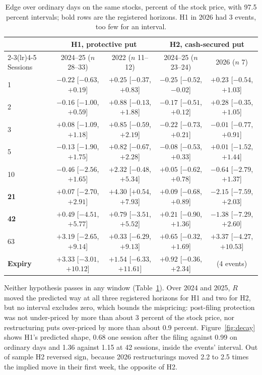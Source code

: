 \documentclass[11pt]{article}
\makeatletter
\renewcommand\section{\@startsection{section}{1}{\z@}{-1.2ex \@plus -.3ex \@minus -.2ex}{0.4ex}{\normalfont\normalsize\bfseries}}
\makeatother
\begin{document}
\section{Results}
\begin{table}[h]
\centering
\caption{Edge over ordinary days on the same stocks, percent of the stock price, with 97.5 percent intervals; bold rows are the registered horizons. H1 in 2026 had 3 events, too few for an interval.}
\label{tab:edge}
\small
\setlength{\tabcolsep}{4pt}
\begin{tabular}{lcccc}
\toprule
 & \multicolumn{2}{c}{H1, protective put} & \multicolumn{2}{c}{H2, cash-secured put} \\
\cmidrule(lr){2-3}\cmidrule(lr){4-5}
Sessions & 2024--25 ($n$ 28--33) & 2022 ($n$ 11--12) & 2024--25 ($n$ 23--24) & 2026 ($n$ 7) \\
\midrule
1  & $-0.22$ [$-0.63$, $+0.19$] & $+0.25$ [$-0.37$, $+0.83$] & $-0.25$ [$-0.52$, $-0.02$] & $+0.23$ [$-0.54$, $+1.03$] \\
2  & $-0.16$ [$-1.00$, $+0.59$] & $+0.88$ [$-0.13$, $+1.88$] & $-0.17$ [$-0.51$, $+0.12$] & $+0.28$ [$-0.35$, $+1.05$] \\
3  & $+0.08$ [$-1.09$, $+1.18$] & $+0.85$ [$-0.59$, $+2.19$] & $-0.22$ [$-0.73$, $+0.21$] & $-0.01$ [$-0.77$, $+0.91$] \\
5  & $-0.13$ [$-1.90$, $+1.75$] & $+0.82$ [$-0.67$, $+2.28$] & $-0.08$ [$-0.53$, $+0.33$] & $+0.01$ [$-1.52$, $+1.44$] \\
10 & $-0.46$ [$-2.56$, $+1.65$] & $+2.32$ [$-0.48$, $+5.34$] & $+0.05$ [$-0.62$, $+0.78$] & $-0.64$ [$-2.79$, $+1.37$] \\
\textbf{21} & $+0.07$ [$-2.70$, $+2.91$] & $\mathbf{+4.30}$ [$+0.54$, $+7.93$] & $+0.09$ [$-0.68$, $+0.89$] & $-2.15$ [$-7.59$, $+2.03$] \\
\textbf{42} & $+0.49$ [$-4.51$, $+5.77$] & $+0.79$ [$-3.51$, $+5.52$] & $+0.21$ [$-0.90$, $+1.36$] & $-1.38$ [$-7.29$, $+2.60$] \\
63 & $+3.19$ [$-2.65$, $+9.14$] & $+0.33$ [$-6.29$, $+9.13$] & $+0.65$ [$-0.32$, $+1.69$] & $+3.37$ [$-4.27$, $+10.53$] \\
\textbf{Expiry} & $+3.33$ [$-3.01$, $+10.12$] & $+1.54$ [$-6.33$, $+11.61$] & $+0.92$ [$-0.36$, $+2.34$] & (4 events) \\
\bottomrule
\end{tabular}
\end{table}

Neither hypothesis passes in any window (Table~\ref{tab:edge}). Over 2024 and 2025, $R$ moved the predicted way at all three registered horizons for H1 and two for H2, but no interval excludes zero, which bounds the mispricing: post-filing protection was not under-priced by more than about 3 percent of the stock price, nor restructuring puts over-priced by more than about 0.9 percent. Figure~\ref{fig:decay} shows H1's predicted shape, 0.68 one session after the filing against 0.99 on ordinary days and 1.36 against 1.15 at 42 sessions, inside the events' interval. Out of sample H2 reversed sign, because 2026 restructurings moved 2.2 to 2.5 times the implied move in their first week, the opposite of H2.
\end{document}
